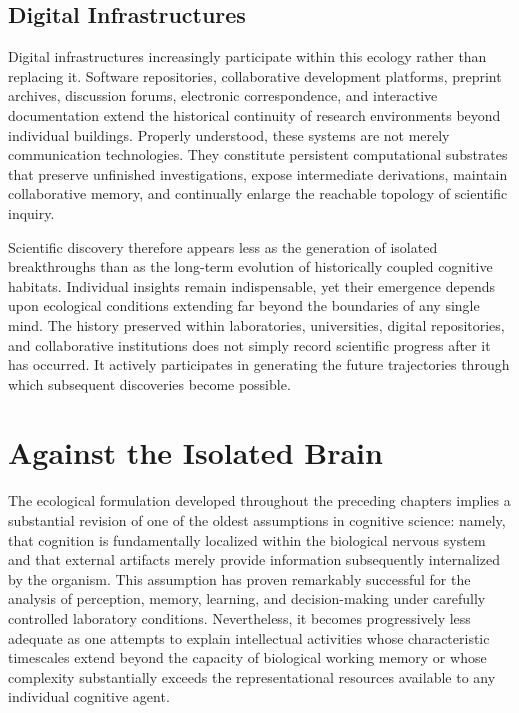 \documentclass[12pt,oneside]{article}
\theoremstyle{remark}
\begin{document}
\subsection{Digital Infrastructures}

Digital infrastructures increasingly participate within this ecology rather than replacing it. Software repositories, collaborative development platforms, preprint archives, discussion forums, electronic correspondence, and interactive documentation extend the historical continuity of research environments beyond individual buildings. Properly understood, these systems are not merely communication technologies. They constitute persistent computational substrates that preserve unfinished investigations, expose intermediate derivations, maintain collaborative memory, and continually enlarge the reachable topology of scientific inquiry.

Scientific discovery therefore appears less as the generation of isolated breakthroughs than as the long-term evolution of historically coupled cognitive habitats. Individual insights remain indispensable, yet their emergence depends upon ecological conditions extending far beyond the boundaries of any single mind. The history preserved within laboratories, universities, digital repositories, and collaborative institutions does not simply record scientific progress after it has occurred. It actively participates in generating the future trajectories through which subsequent discoveries become possible.



\section{Against the Isolated Brain}

The ecological formulation developed throughout the preceding chapters implies a substantial revision of one of the oldest assumptions in cognitive science: namely, that cognition is fundamentally localized within the biological nervous system and that external artifacts merely provide information subsequently internalized by the organism. This assumption has proven remarkably successful for the analysis of perception, memory, learning, and decision-making under carefully controlled laboratory conditions. Nevertheless, it becomes progressively less adequate as one attempts to explain intellectual activities whose characteristic timescales extend beyond the capacity of biological working memory or whose complexity substantially exceeds the representational resources available to any individual cognitive agent.
\end{document}
